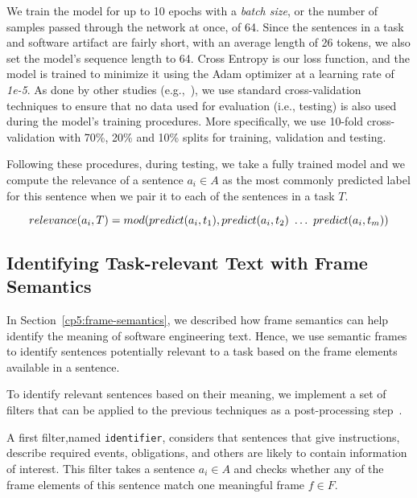 We train the model for up to 10 epochs with a \textit{batch size}, or the number of samples passed through the network at once, of 64. Since the sentences in a task and software artifact are fairly short, with an average length of 26 tokens, we also set the model's sequence length to 64. Cross Entropy is our loss function, and the model is trained to minimize it using the Adam optimizer at a learning rate of \textit{1e-5}.
As done by other studies (e.g.,~\cite{Chaparro2017, fucci2019, Petrosyan2015}), we use standard cross-validation techniques to ensure  that no data used for evaluation (i.e., testing) is also used
during the model's training procedures. More specifically, we use 10-fold cross-validation with 70\%, 20\% and 10\% splits for training, validation and testing. 




Following these procedures, during testing, we take a fully trained model and we compute the relevance of a sentence $a_i \in A$ as the most commonly predicted label for this sentence when we pair it to each of the sentences in a task $T$.

\begin{equation}
    relevance(a_i, T) = mod(predict(a_i, t_1), predict(a_i, t_2) ~\dots~ predict(a_i, t_m)) \\
\end{equation}





\subsection{Identifying Task-relevant Text with Frame Semantics}
\label{cp5:approach-filters}





In Section~\ref{cp5:frame-semantics}, we described how frame semantics can help identify the meaning of software engineering text. Hence, we use semantic frames to identify sentences potentially relevant to a task based on the frame elements available in a sentence.



To identify relevant sentences based on their meaning, we implement a set of filters that can be applied to the previous techniques as a post-processing step~\cite{Manning2009IR}.

A first filter,named \texttt{identifier}, considers that sentences that give instructions, describe required events, obligations, and others are likely to contain information of interest. This filter takes a sentence $a_i \in A$ and checks whether any of the frame elements of this sentence match one meaningful frame $f \in F$. 





